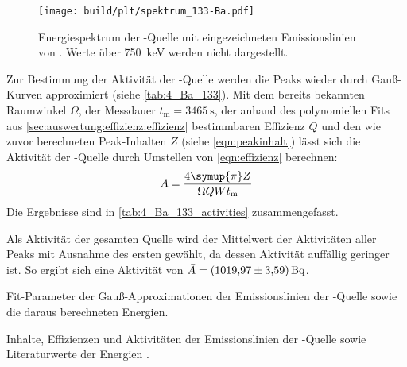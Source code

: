 \begin{figure}
    \centering
    \texttt{[image: build/plt/spektrum\_133-Ba.pdf]}
    \caption{
        Energiespektrum der -Quelle mit eingezeichneten Emissionslinien von  \cite{lara}.
        Werte über \SI{750}{\kilo\electronvolt} werden nicht dargestellt.
    }
    \label{fig:plt:spektrum_Ba_133}
\end{figure}

Zur Bestimmung der Aktivität der -Quelle
werden die Peaks wieder durch Gauß-Kurven approximiert
    (siehe \autoref{tab:4_Ba_133}).
Mit
    dem bereits bekannten Raumwinkel $\Omega$,
    der Messdauer $t_\text{m} = \SI{3465}{\second}$,
    der anhand des polynomiellen Fits aus \autoref{sec:auswertung:effizienz:effizienz} bestimmbaren Effizienz $Q$
    und den wie zuvor berechneten Peak-Inhalten $Z$ (siehe \autoref{eqn:peakinhalt})
lässt sich die Aktivität der -Quelle durch Umstellen von \autoref{eqn:effizienz} berechnen:
\begin{equation}
    A = \frac{4 \symup{\pi} Z}{\Omega Q W t_\text{m}}
\end{equation}
Die Ergebnisse sind in \autoref{tab:4_Ba_133_activities} zusammengefasst.

Als Aktivität der gesamten Quelle wird der Mittelwert der Aktivitäten aller Peaks mit Ausnahme des ersten gewählt,
    da dessen Aktivität auffällig geringer ist.
So ergibt sich eine Aktivität von $\bar A = \SI{1019.97 \pm 3.59}{\becquerel}$.

\begin{table}
    \centering
    \caption{
        Fit-Parameter der Gauß-Approximationen der Emissionslinien der -Quelle
        sowie die daraus berechneten Energien.
    }
    \label{tab:4_Ba_133}
\end{table}

\begin{table}
    \centering
    \caption{
        Inhalte, Effizienzen und Aktivitäten der Emissionslinien der -Quelle
        sowie Literaturwerte der Energien \cite{lara}.
    }
    \label{tab:4_Ba_133_activities}
\end{table}


\FloatBarrier
